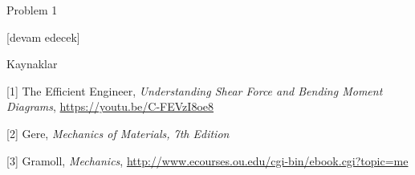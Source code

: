 \documentclass[12pt,fleqn]{article}\usepackage{../../common}
\begin{document}
Problem 1














[devam edecek]

Kaynaklar 

[1] The Efficient Engineer, {\em Understanding Shear Force and Bending Moment Diagrams},
    \url{https://youtu.be/C-FEVzI8oe8}

[2] Gere, {\em Mechanics of Materials, 7th Edition}

[3] Gramoll, {\em Mechanics},
    \url{http://www.ecourses.ou.edu/cgi-bin/ebook.cgi?topic=me}
\end{document}
